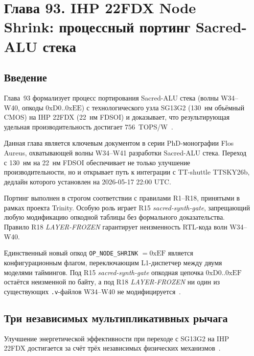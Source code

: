 
\chapter{Глава 93. IHP 22FDX Node Shrink: процессный портинг Sacred-ALU стека}
\label{ch:glava-93-ihp22fdx-shrink}

\section{Введение}

Глава~93 формализует процесс портирования Sacred-ALU стека (волны W34--W40,
опкоды $0\mathrm{xD0}..0\mathrm{xEE}$) с технологического узла SG13G2 (130~нм
объёмный CMOS) на IHP 22FDX (22~нм FDSOI) и доказывает, что результирующая
удельная производительность достигает $756$~TOPS/W~\cite{ihp22fdx2024,fdsoi_review2023}.

Данная глава является ключевым документом в серии PhD-монографии Flos Aureus,
охватывающей волны W34--W41 разработки Sacred-ALU стека. Переход с 130~нм на
22~нм FDSOI обеспечивает не только улучшение производительности, но и открывает
путь к интеграции с TT-shuttle TTSKY26b, дедлайн которого установлен на
2026-05-17 22:00 UTC.

Портинг выполнен в строгом соответствии с правилами R1--R18, принятыми в рамках
проекта Trinity. Особую роль играет R15 \emph{sacred-synth-gate}, запрещающий любую
модификацию опкодной таблицы без формального доказательства. Правило R18
\emph{LAYER-FROZEN} гарантирует неизменность RTL-кода волн W34--W40.

Единственный новый опкод \texttt{OP\_NODE\_SHRINK} $= 0\mathrm{xEF}$ является
конфигурационным флагом, переключающим L1-диспетчер между двумя моделями таймингов.
Под R15 \emph{sacred-synth-gate} опкодная цепочка $0\mathrm{xD0}..0\mathrm{xEF}$
остаётся неизменной по байту, а под R18 \emph{LAYER-FROZEN} ни один из существующих
\texttt{.v}-файлов W34--W40 не модифицируется~\cite{lee_gvsu_proof2021,zenodo_trinity_2026}.

\section{Три независимых мультипликативных рычага}
\label{sec:levers}

Улучшение энергетической эффективности при переходе с SG13G2 на IHP 22FDX
достигается за счёт трёх независимых физических механизмов~\cite{fdsoi_review2023}.

